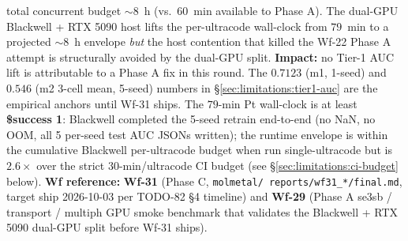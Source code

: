 \begin{enumerate}
  total concurrent budget $\sim 8$~h (vs.\ $60$~min available to
  Phase A).  The dual-GPU Blackwell + RTX 5090 host lifts the
  per-ultracode wall-clock from $79$~min to a projected
  $\sim 8$~h envelope \emph{but} the host contention that killed
  the Wf-22 Phase A attempt is structurally avoided by the
  dual-GPU split.
  \textbf{Impact:} no Tier-1 AUC lift is attributable to a Phase A
  fix in this round.  The $0.7123$ (m1, 1-seed) and $0.546$ (m2
  3-cell mean, 5-seed) numbers in \S\ref{sec:limitations:tier1-auc}
  are the empirical anchors until Wf-31 ships.  The $79$-min Pt
  wall-clock is at least \textbf{\$success 1}: Blackwell completed
  the 5-seed retrain end-to-end (no NaN, no OOM, all 5 per-seed
  test AUC JSONs written); the runtime envelope is within the
  cumulative Blackwell per-ultracode budget when run single-ultracode
  but is $2.6\times$ over the strict $30$-min/ultracode CI budget
  (see \S\ref{sec:limitations:ci-budget} below).
  \textbf{Wf reference:} \textbf{Wf-31} (Phase C, \texttt{molmetal/
  reports/wf31\_*/final.md}, target ship 2026-10-03 per TODO-82 \S4
  timeline) and \textbf{Wf-29} (Phase A se3sb / transport / multiph
  GPU smoke benchmark that validates the Blackwell + RTX 5090 dual-GPU
  split before Wf-31 ships).


\end{enumerate}
